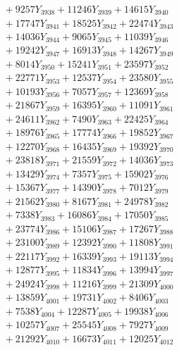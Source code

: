 \documentclass[a4paper,10pt]{article}
\begin{document}
{\begin{align}
&\;  + 9257 Y_{3938} + 11246 Y_{3939} + 14615 Y_{3940} \\[0.3ex]
&\;  + 17747 Y_{3941} + 18525 Y_{3942} + 22474 Y_{3943} \\[0.3ex]
&\;  + 14036 Y_{3944} + 9065 Y_{3945} + 11039 Y_{3946} \\[0.3ex]
&\;  + 19242 Y_{3947} + 16913 Y_{3948} + 14267 Y_{3949} \\[0.3ex]
&\;  + 8014 Y_{3950} + 15241 Y_{3951} + 23597 Y_{3952} \\[0.3ex]
&\;  + 22771 Y_{3953} + 12537 Y_{3954} + 23580 Y_{3955} \\[0.3ex]
&\;  + 10193 Y_{3956} + 7057 Y_{3957} + 12369 Y_{3958} \\[0.5ex]\allowbreak
&\;  + 21867 Y_{3959} + 16395 Y_{3960} + 11091 Y_{3961} \\[0.3ex]
&\;  + 24611 Y_{3962} + 7490 Y_{3963} + 22425 Y_{3964} \\[0.3ex]
&\;  + 18976 Y_{3965} + 17774 Y_{3966} + 19852 Y_{3967} \\[0.3ex]
&\;  + 12270 Y_{3968} + 16435 Y_{3969} + 19392 Y_{3970} \\[0.3ex]
&\;  + 23818 Y_{3971} + 21559 Y_{3972} + 14036 Y_{3973} \\[0.3ex]
&\;  + 13429 Y_{3974} + 7357 Y_{3975} + 15902 Y_{3976} \\[0.3ex]
&\;  + 15367 Y_{3977} + 14390 Y_{3978} + 7012 Y_{3979} \\[0.3ex]
&\;  + 21562 Y_{3980} + 8167 Y_{3981} + 24978 Y_{3982} \\[0.3ex]
&\;  + 7338 Y_{3983} + 16086 Y_{3984} + 17050 Y_{3985} \\[0.3ex]
&\;  + 23774 Y_{3986} + 15106 Y_{3987} + 17267 Y_{3988} \\[0.5ex]\allowbreak
&\;  + 23100 Y_{3989} + 12392 Y_{3990} + 11808 Y_{3991} \\[0.3ex]
&\;  + 22117 Y_{3992} + 16339 Y_{3993} + 19113 Y_{3994} \\[0.3ex]
&\;  + 12877 Y_{3995} + 11834 Y_{3996} + 13994 Y_{3997} \\[0.3ex]
&\;  + 24924 Y_{3998} + 11216 Y_{3999} + 21309 Y_{4000} \\[0.3ex]
&\;  + 13859 Y_{4001} + 19731 Y_{4002} + 8406 Y_{4003} \\[0.3ex]
&\;  + 7538 Y_{4004} + 12287 Y_{4005} + 19938 Y_{4006} \\[0.3ex]
&\;  + 10257 Y_{4007} + 25545 Y_{4008} + 7927 Y_{4009} \\[0.3ex]
&\;  + 21292 Y_{4010} + 16673 Y_{4011} + 12025 Y_{4012} \\[0.3ex]

\end{align}}
\end{document}
